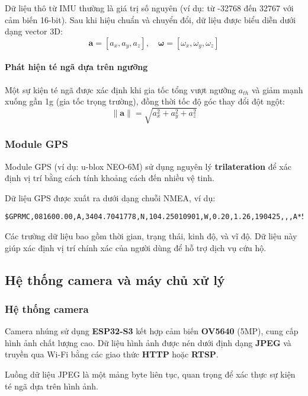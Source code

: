 Dữ liệu thô từ IMU thường là giá trị số nguyên (ví dụ: từ -32768 đến 32767 với cảm biến 16-bit). Sau khi hiệu chuẩn và chuyển đổi, dữ liệu được biểu diễn dưới dạng vector 3D:
\[
\mathbf{a} = [a_x, a_y, a_z], \quad
\boldsymbol{\omega} = [\omega_x, \omega_y, \omega_z]
\]

\paragraph{Phát hiện té ngã dựa trên ngưỡng} 
Một sự kiện té ngã được xác định khi gia tốc tổng vượt ngưỡng $a_{th}$ và giảm mạnh xuống gần 1g (gia tốc trọng trường), đồng thời tốc độ góc thay đổi đột ngột:
\[
\|\mathbf{a}\| = \sqrt{a_x^2 + a_y^2 + a_z^2}
\]

\subsubsection{Module GPS}
Module GPS (ví dụ: u-blox NEO-6M) sử dụng nguyên lý \textbf{trilateration} để xác định vị trí bằng cách tính khoảng cách đến nhiều vệ tinh.  

Dữ liệu GPS được xuất ra dưới dạng chuỗi NMEA, ví dụ:
\begin{verbatim}
$GPRMC,081600.00,A,3404.7041778,N,104.25010901,W,0.20,1.26,190425,,,A*5B
\end{verbatim}
Các trường dữ liệu bao gồm thời gian, trạng thái, kinh độ, và vĩ độ. Dữ liệu này giúp xác định vị trí chính xác của người dùng để hỗ trợ dịch vụ cứu hộ.

\subsection{Hệ thống camera và máy chủ xử lý}

\subsubsection{Hệ thống camera}
Camera nhúng sử dụng \textbf{ESP32-S3} kết hợp cảm biến \textbf{OV5640} (5MP), cung cấp hình ảnh chất lượng cao. Dữ liệu hình ảnh được nén dưới định dạng \textbf{JPEG} và truyền qua Wi-Fi bằng các giao thức \textbf{HTTP} hoặc \textbf{RTSP}.

Luồng dữ liệu JPEG là một mảng byte liên tục, quan trọng để xác thực sự kiện té ngã dựa trên hình ảnh.

